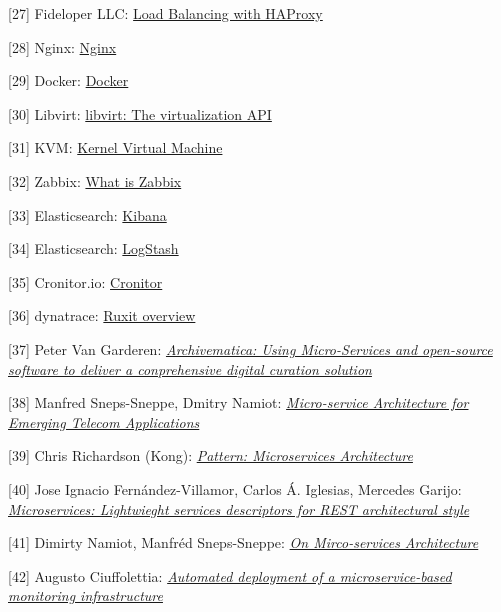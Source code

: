 \documentclass[11pt,magyar,a4paper,oneside,]{report}
\begin{document}
{[}27{]} Fideloper LLC:
\href{https://serversforhackers.com/load-balancing-with-haproxy}{Load
Balancing with HAProxy}

{[}28{]} Nginx: \href{https://www.nginx.com/}{Nginx}

{[}29{]} Docker: \href{https://www.docker.com/}{Docker}

{[}30{]} Libvirt: \href{https://libvirt.org/}{libvirt: The
virtualization API}

{[}31{]} KVM: \href{http://www.linux-kvm.org/page/Main_Page}{Kernel
Virtual Machine}

{[}32{]} Zabbix: \href{http://www.zabbix.com/product.php}{What is
Zabbix}

{[}33{]} Elasticsearch:
\href{https://www.elastic.co/products/kibana}{Kibana}

{[}34{]} Elasticsearch:
\href{https://www.elastic.co/products/logstash}{LogStash}

{[}35{]} Cronitor.io: \href{https://cronitor.io/}{Cronitor}

{[}36{]} dynatrace:
\href{https://ruxit.com/why-ruxit/overview/\#whyruxitoverview_start}{Ruxit
overview}

{[}37{]} Peter Van Garderen:
\href{http://citeseerx.ist.psu.edu/viewdoc/download?doi=10.1.1.384.7168\&rep=rep1\&type=pdf\#page=145}{\emph{Archivematica:
Using Micro-Services and open-source software to deliver a conprehensive
digital curation solution}}

{[}38{]} Manfred Sneps-Sneppe, Dmitry Namiot:
\href{http://injoit.ru/index.php/j1/article/view/161/119}{\emph{Micro-service
Architecture for Emerging Telecom Applications}}

{[}39{]} Chris Richardson (Kong):
\href{http://microservices.io/patterns/microservices.html}{\emph{Pattern:
Microservices Architecture}}

{[}40{]} Jose Ignacio Fernández-Villamor, Carlos Á. Iglesias, Mercedes
Garijo:
\href{http://oa.upm.es/8128/1/INVE_MEM_2010_81293.pdf}{\emph{Microservices:
Lightwieght services descriptors for REST architectural style}}

{[}41{]} Dimirty Namiot, Manfréd Sneps-Sneppe:
\href{http://cyberleninka.ru/article/n/on-micro-services-architecture}{\emph{On
Mirco-services Architecture}}

{[}42{]} Augusto Ciuffolettia:
\href{http://ac.els-cdn.com/S187705091503077X/1-s2.0-S187705091503077X-main.pdf?_tid=83f9a800-e3fa-11e5-9747-00000aacb35e\&acdnat=1457310260_fa7b3e651c221cf0307fbb2d6c7f59a6}{\emph{Automated
deployment of a microservice-based monitoring infrastructure}}
\end{document}
